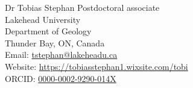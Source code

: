 \documentclass[10pt, paper=letter]{scrartcl} %
\begin{document}

\begin{cv}{Dr Tobias Stephan}
\medskip
\noindent  Postdoctoral associate\smallskip \\
Lakehead University\\
Department of Geology\\
Thunder Bay, ON, Canada\smallskip \\
\noindent Email: \href{mailto:tstephan@lakeheadu.ca}{tstephan@lakeheadu.ca}\\
Website: \href{https://tobiasstephan1.wixsite.com/tobi}{https://tobiasstephan1.wixsite.com/tobi}\\
ORCID: \href{https://orcid.org/0000-0002-9290-014X}{0000-0002-9290-014X}


% 
% 


\end{cv}
\end{document}
